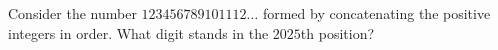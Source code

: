 Consider the number $123456789101112\ldots$ formed by concatenating the positive integers in order. What digit stands in the $2025$th position?
